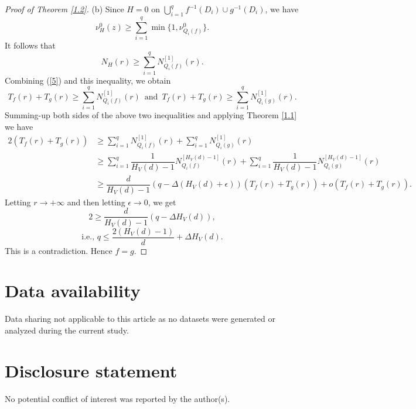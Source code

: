 \documentclass[12pt]{amsart}
\begin{document}
\begin{proof}[Proof of Theorem \ref{1.2}]
(b) Since $H=0$ on $\bigcup_{i=1}^qf^{-1}(D_i)\cup g^{-1}(D_i)$, we have
$$\nu^0_H(z)\ge \sum_{i=1}^q\min\{1,\nu^0_{Q_i(f)}\}.$$
It follows that
$$N_H(r)\ge \sum_{i=1}^qN^{[1]}_{Q_i(f)}(r).$$
Combining (\ref{5}) and this inequality, we obtain
$$ T_f(r)+T_g(r) \ge \sum_{i=1}^qN^{[1]}_{Q_i(f)}(r)\, \text{ and }\, T_f(r)+T_g(r) \ge \sum_{i=1}^qN^{[1]}_{Q_i(g)}(r).$$
Summing-up both sides of the above two inequalities and applying Theorem \ref{1.1} we have
\begin{align*}
2(T_f(r)+T_g(r))&\ge\sum_{i=1}^qN^{[1]}_{Q_i(f)}(r)+\sum_{i=1}^qN^{[1]}_{Q_i(g)}(r)\\
&\ge \sum_{i=1}^q\dfrac{1}{H_V(d)-1}N^{[H_V(d)-1]}_{Q_i(f)}(r)+\sum_{i=1}^q\dfrac{1}{H_V(d)-1}N^{[H_V(d)-1]}_{Q_i(g)}(r)\\
&\ge \dfrac{d}{H_V(d)-1}(q-\Delta (H_V(d)+\epsilon))(T_f(r)+T_g(r))+o(T_f(r)+T_g(r)).
\end{align*}
Letting $r\longrightarrow +\infty$ and then letting $\epsilon\longrightarrow 0$, we get 
$$2 \ge \dfrac{d}{H_V(d)-1}(q-\Delta H_V(d)),$$
$$\text{i.e., } q\le \frac{2(H_V(d)-1)}{d}+\Delta H_V(d).$$
This is a contradiction.
Hence $f=g$.
\end{proof}

\section*{Data availability}
Data sharing not applicable to this article as no datasets were generated or analyzed during the current study.

\section*{Disclosure statement}
No potential conflict of interest was reported by the author(s).
\end{document}
